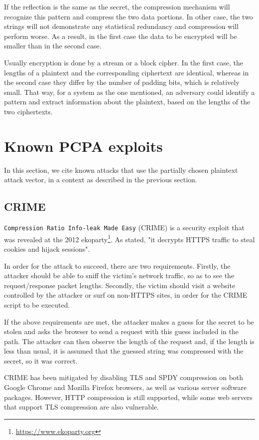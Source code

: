 If the reflection is the same as the secret, the compression mechanism will
recognize this pattern and compress the two data portions. In other case, the
two strings will not demonstrate any statistical redundancy and compression will
perform worse. As a result, in the first case the data to be encrypted will be
smaller than in the second case.

Usually encryption is done by a stream or a block cipher. In the first case, the
lengths of a plaintext and the corresponding ciphertext are identical, whereas
in the second case they differ by the number of padding bits, which is
relatively small. That way, for a system as the one mentioned, an adversary
could identify a pattern and extract information about the plaintext, based on
the lengths of the two ciphertexts.

\section{Known PCPA exploits}\label{sec:known_pcpa}

In this section, we cite known attacks that use the partially chosen plaintext
attack vector, in a context as described in the previous section.

\subsection{CRIME}

\texttt{Compression Ratio Info-leak Made Easy} (CRIME) \cite{crime} is a
security exploit that was revealed at the 2012
ekoparty\footnote{\url{https://www.ekoparty.org}}.  As stated, "it decrypts
HTTPS traffic to steal cookies and hijack sessions".

In order for the attack to succeed, there are two requirements. Firstly, the
attacker should be able to sniff the victim's network traffic, so as to see the
request/response packet lengths. Secondly, the victim should visit a website
controlled by the attacker or surf on non-HTTPS sites, in order for the CRIME
script to be executed.

If the above requirements are met, the attacker makes a guess for the secret to
be stolen and asks the browser to send a request with this guess included in the
path.  The attacker can then observe the length of the request and, if the
length is less than usual, it is assumed that the guessed string was compressed
with the secret, so it was correct.

CRIME has been mitigated by disabling TLS and SPDY compression on both Google
Chrome and Mozilla Firefox browsers, as well as various server software
packages. However, HTTP compression is still supported, while some web servers
that support TLS compression are also vulnerable.

